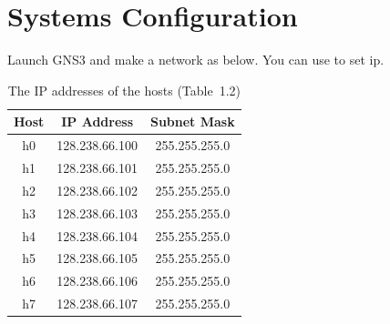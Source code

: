 \documentclass{../UTNetLab}
\begin{document}
\section*{Systems Configuration}
Launch GNS3 and make a network as below.
You can use  to set ip.
\begin{center}
    \begin{minipage}{0.48\textwidth}
        \begin{flushleft}
            \begin{table}[H]
                \caption{The IP addresses of the hosts (Table~1.2)}
                \centering
                \begin{tabular}{ c c c }
                    \hline \hline
                    Host & IP Address     & Subnet Mask   \\
                    \hline
                    h0   & 128.238.66.100 & 255.255.255.0 \\
                    h1   & 128.238.66.101 & 255.255.255.0 \\
                    h2   & 128.238.66.102 & 255.255.255.0 \\
                    h3   & 128.238.66.103 & 255.255.255.0 \\
                    h4   & 128.238.66.104 & 255.255.255.0 \\
                    h5   & 128.238.66.105 & 255.255.255.0 \\
                    h6   & 128.238.66.106 & 255.255.255.0 \\
                    h7   & 128.238.66.107 & 255.255.255.0 \\
                    \hline \hline
                \end{tabular}
            \end{table}
        \end{flushleft}
    \end{minipage}
    \begin{minipage}{0.48\textwidth}
        \begin{flushright}
            \begin{figure}[H]
                \centering
\end{figure}
\end{flushright}
\end{minipage}
\end{center}
\end{document}
